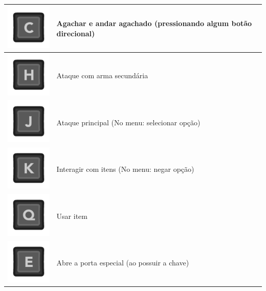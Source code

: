 \begin{longtable}{|c|p{10cm}|}
\hline
\includegraphics[scale=0.3]{images/kC.png}
& Agachar e andar agachado (pressionando algum botão direcional)
\\
\hline
\includegraphics[scale=0.3]{images/kH.png}
& Ataque com arma secundária
\\
\hline
\includegraphics[scale=0.3]{images/kJ.png}
& Ataque principal (No menu: selecionar opção)
\\
\hline
\includegraphics[scale=0.3]{images/kK.png}
& Interagir com itens (No menu: negar opção)
\\
\hline
\includegraphics[scale=0.3]{images/kQ.png}
& Usar item 
\\
\hline
\includegraphics[scale=0.3]{images/kE.png}
& Abre a porta especial (ao possuir a chave) 
\\
\hline
\end{longtable}

